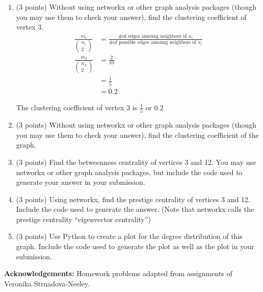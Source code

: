 \documentclass[11pt]{article}
\begin{document}
\begin{enumerate}
    \item (3 points) Without using networkx or other graph analysis packages
    (though you may use them to check your answer), find the clustering
    coefficient of vertex 3.
    \begin{align*}
        \frac{ m_{i} }{ ( \substack{ n_{i} \\ 2} ) } &= \frac{ \text{\# of edges amoung neighbors of } x_{i} }{ \text{\# of possible edges amoung neighbors of } x_{i} } \\
        \frac{ m_{3} }{ ( \substack{ n_{3} \\ 2} ) } &= \frac{2}{10} \\
        &= \frac{1}{5} \\
        &= 0.2
    \end{align*}
    \begin{tcolorbox}[width=\linewidth,title=Problem 3 Answer - Clustering Coefficient]
        The clustering coefficient of vertex 3 is $\frac{1}{5}$ or $0.2$
    \end{tcolorbox}

    \item (3 points) Without using networkx or other graph analysis packages
    (though you may use them to check your answer), find the clustering
    coefficient of the graph.

    \item (3 points) Find the betweenness centrality of vertices 3 and 12. You
    may use networkx or other graph analysis packages, but include the code used
    to generate your answer in your submission.

    \item (3 points) Using networkx, find the prestige centrality of vertices 3
    and 12. Include the code used to generate the answer. (Note that networkx
    calls the prestige centrality ``eigenvector centrality'')

    \item (3 points) Use Python to create a plot for the degree distribution of
    this graph.  Include the code used to generate the plot as well as the plot
    in your submission.

\end{enumerate}

{\bf Acknowledgements:} Homework problems adapted from assignments of
Veronika Strnadova-Neeley.
\end{document}
